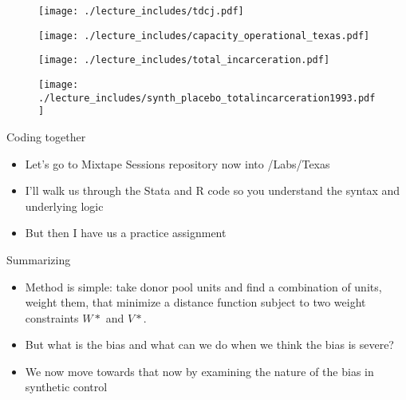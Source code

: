 \documentclass{beamer}
\begin{document}
\begin{frame}[shrink=30,plain]

\begin{figure}
\texttt{[image: ./lecture\_includes/tdcj.pdf]}
\end{figure}
\end{frame}


\begin{frame}[shrink=30,plain]
\begin{figure}
\texttt{[image: ./lecture\_includes/capacity\_operational\_texas.pdf]}
\end{figure}
\end{frame}



\begin{frame}[shrink=30,plain]

\begin{figure}
\texttt{[image: ./lecture\_includes/total\_incarceration.pdf]}
\end{figure}
\end{frame}

\begin{frame}[shrink=30,plain]

\begin{figure}
\texttt{[image: ./lecture\_includes/synth\_placebo\_totalincarceration1993.pdf]}
\end{figure}
\end{frame}


\begin{frame}{Coding together}

\begin{itemize}
\item Let's go to Mixtape Sessions repository now into /Labs/Texas 
\item I'll walk us through the Stata and R code so you understand the syntax and underlying logic
\item But then I have us a practice assignment 
\end{itemize}

\end{frame}


\begin{frame}{Summarizing}

\begin{itemize}

\item Method is simple: take donor pool units and find a combination of units, weight them, that minimize a distance function subject to two weight constraints $W*$ and $V*$.
\item But what is the bias and what can we do when we think the bias is severe?
\item We now move towards that now by examining the nature of the bias in synthetic control
\end{itemize}

\end{frame}
\end{document}
